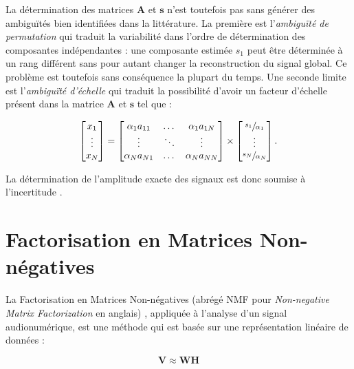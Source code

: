 La détermination des matrices $\mathbf{A}$ et $\mathbf{s}$ n'est toutefois pas sans générer des ambiguïtés bien identifiées dans la littérature. La première est l'\textit{ambiguïté de permutation} qui traduit la variabilité dans l'ordre de détermination des composantes indépendantes : une composante estimée $s_1$ peut être déterminée à un rang différent sans pour autant changer la reconstruction du signal global. Ce problème est toutefois sans conséquence la plupart du temps. Une seconde limite est l'\textit{ambiguïté d'échelle} qui traduit la possibilité d'avoir un facteur d'échelle présent dans la matrice $\mathbf{A}$ et $\mathbf{s}$ tel que :

\begin{equation}
\begin{bmatrix}
x_{1}\\
\vdots\\
x_{N}
\end{bmatrix} =
\begin{bmatrix}
\alpha_1 a_{11} & \dots & \alpha_1 a_{1N}\\
\vdots & \ddots & \vdots\\
\alpha_N a_{N1} & \dots & \alpha_N a_{NN}
\end{bmatrix}
\times
\begin{bmatrix}
\sfrac{s_{1}}{\alpha_1}\\
\vdots\\
\sfrac{s_{N}}{\alpha_N}
\end{bmatrix}.
\end{equation}

La détermination de l'amplitude exacte des signaux est donc soumise à l'incertitude \cite{naik2011overview}.

\section{Factorisation en Matrices Non-négatives}

La Factorisation en Matrices Non-négatives (abrégé NMF pour \textit{Non-negative Matrix Factorization} en anglais) \cite{lee_learning_1999}, appliquée à l'analyse d'un signal audionumérique, est une méthode qui est basée sur une représentation linéaire de données :

\begin{equation}
\mathbf{V} \approx  \mathbf{WH}
\end{equation}

